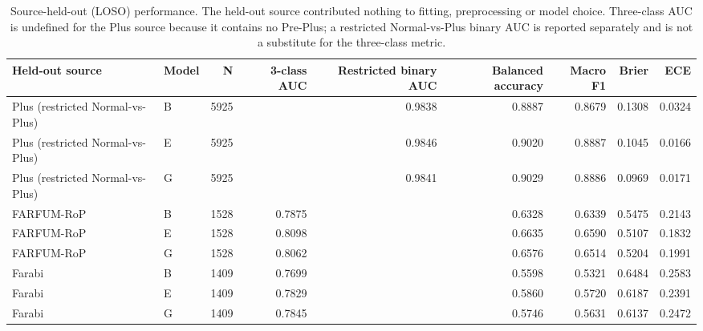 \begin{table}[htbp]
\centering
\small
\caption{Source-held-out (LOSO) performance. The held-out source contributed nothing to fitting, preprocessing or model choice. Three-class AUC is undefined for the Plus source because it contains no Pre-Plus; a restricted Normal-vs-Plus binary AUC is reported separately and is not a substitute for the three-class metric.}
\label{tab:loso}
\begin{tabular}{p{4.4cm}lrrrrrrr}
\toprule
Held-out source & Model & N & 3-class AUC & Restricted binary AUC & Balanced accuracy & Macro F1 & Brier & ECE \\
\midrule
Plus (restricted Normal-vs-Plus) & B & 5925 &  & 0.9838 & 0.8887 & 0.8679 & 0.1308 & 0.0324 \\
Plus (restricted Normal-vs-Plus) & E & 5925 &  & 0.9846 & 0.9020 & 0.8887 & 0.1045 & 0.0166 \\
Plus (restricted Normal-vs-Plus) & G & 5925 &  & 0.9841 & 0.9029 & 0.8886 & 0.0969 & 0.0171 \\
FARFUM-RoP & B & 1528 & 0.7875 &  & 0.6328 & 0.6339 & 0.5475 & 0.2143 \\
FARFUM-RoP & E & 1528 & 0.8098 &  & 0.6635 & 0.6590 & 0.5107 & 0.1832 \\
FARFUM-RoP & G & 1528 & 0.8062 &  & 0.6576 & 0.6514 & 0.5204 & 0.1991 \\
Farabi & B & 1409 & 0.7699 &  & 0.5598 & 0.5321 & 0.6484 & 0.2583 \\
Farabi & E & 1409 & 0.7829 &  & 0.5860 & 0.5720 & 0.6187 & 0.2391 \\
Farabi & G & 1409 & 0.7845 &  & 0.5746 & 0.5631 & 0.6137 & 0.2472 \\
\bottomrule
\end{tabular}
\end{table}
